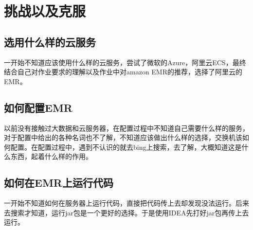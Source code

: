 \section{挑战以及克服}
\subsection{选用什么样的云服务}
一开始不知道应该使用什么样的云服务，尝试了微软的Azure，阿里云ECS，最终结合自己对作业要求的理解以及作业中对amazon EMR的推荐，选择了阿里云的EMR。
\subsection{如何配置EMR}
以前没有接触过大数据和云服务器，在配置过程中不知道自己需要什么样的服务，对于配置中给出的各种名词也不了解，不知道应该做出什么样的选择，交换机该如何配置。在配置过程中，遇到不认识的就去bing上搜索，去了解，大概知道这是什么东西，起着什么样的作用。
\subsection{如何在EMR上运行代码}
一开始不知道如何在服务器上运行代码，直接把代码传上去却发现没法运行。后来去搜索才知道，运行jar包是一个更好的选择。于是使用IDEA先打好jar包再传上去运行。